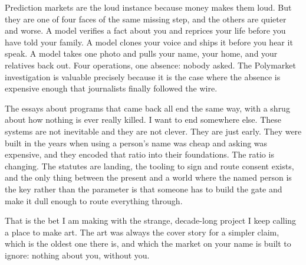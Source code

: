 \documentclass[11pt,letterpaper]{article}
\begin{document}
Prediction markets are the loud instance because money makes them loud. But they are one of four faces of the same missing step, and the others are quieter and worse. A model verifies a fact about you and reprices your life before you have told your family. A model clones your voice and ships it before you hear it speak. A model takes one photo and pulls your name, your home, and your relatives back out. Four operations, one absence: nobody asked. The Polymarket investigation is valuable precisely because it is the case where the absence is expensive enough that journalists finally followed the wire.

\acbreak

The essays about programs that came back all end the same way, with a shrug about how nothing is ever really killed. I want to end somewhere else. These systems are not inevitable and they are not clever. They are just early. They were built in the years when using a person's name was cheap and asking was expensive, and they encoded that ratio into their foundations. The ratio is changing. The statutes are landing, the tooling to sign and route consent exists, and the only thing between the present and a world where the named person is the key rather than the parameter is that someone has to build the gate and make it dull enough to route everything through.

That is the bet I am making with the strange, decade-long project I keep calling a place to make art. The art was always the cover story for a simpler claim, which is the oldest one there is, and which the market on your name is built to ignore: nothing about you, without you.

\end{document}

